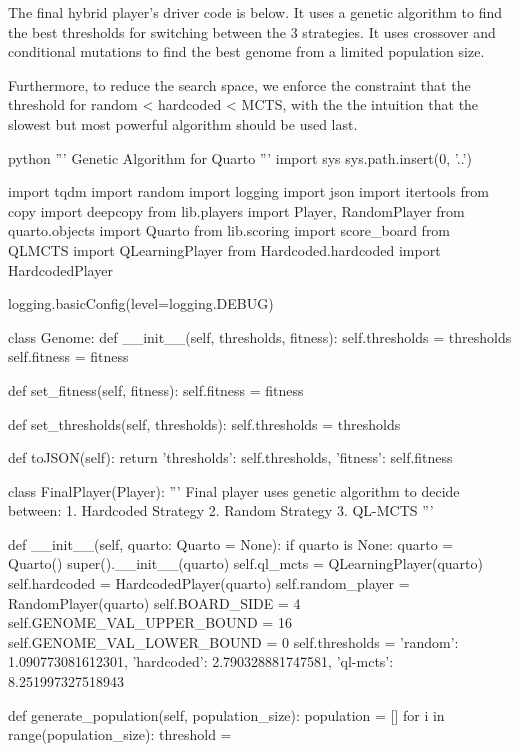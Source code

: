 The final hybrid player's driver code is below. It uses a genetic algorithm to find the best thresholds for switching between the 3 strategies. It uses crossover and conditional mutations to find the best genome from a limited population size.

Furthermore, to reduce the search space, we enforce the constraint that the threshold for random < hardcoded < MCTS, with the the intuition that the slowest but most powerful algorithm should be used last.

\begin{mintedbox}{python}
'''
Genetic Algorithm for Quarto
'''
import sys
sys.path.insert(0, '..')

import tqdm
import random
import logging
import json
import itertools
from copy import deepcopy
from lib.players import Player, RandomPlayer
from quarto.objects import Quarto
from lib.scoring import score_board
from QLMCTS import QLearningPlayer
from Hardcoded.hardcoded import HardcodedPlayer

logging.basicConfig(level=logging.DEBUG)

class Genome:
    def __init__(self, thresholds, fitness):
        self.thresholds = thresholds
        self.fitness = fitness

    def set_fitness(self, fitness):
        self.fitness = fitness

    def set_thresholds(self, thresholds):
        self.thresholds = thresholds

    def toJSON(self):
        return {
            'thresholds': self.thresholds,
            'fitness': self.fitness
        }


class FinalPlayer(Player):
    '''
    Final player uses genetic algorithm to decide between:
    1. Hardcoded Strategy
    2. Random Strategy
    3. QL-MCTS
    '''

    def __init__(self, quarto: Quarto = None):
        if quarto is None:
            quarto = Quarto()
        super().__init__(quarto)
        self.ql_mcts = QLearningPlayer(quarto)
        self.hardcoded = HardcodedPlayer(quarto)
        self.random_player = RandomPlayer(quarto)
        self.BOARD_SIDE = 4
        self.GENOME_VAL_UPPER_BOUND = 16
        self.GENOME_VAL_LOWER_BOUND = 0
        self.thresholds = {
            'random': 1.090773081612301,
            'hardcoded': 2.790328881747581,
            'ql-mcts': 8.251997327518943
        }

    def generate_population(self, population_size):
        population = []
        for i in range(population_size):
            threshold = {}


\end{mintedbox}
